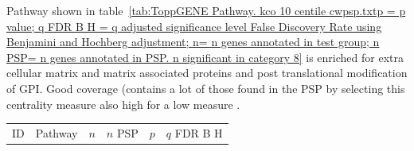 Pathway shown in table~\ref{tab:ToppGENE Pathway. kco 10 centile cwpsp.txtp = p value; q FDR B H = q adjusted significance level False Discovery Rate using Benjamini and Hochberg adjustment; n= n genes annotated in test group; n PSP= n genes annotated in PSP. n significant in category 8} is enriched for extra cellular matrix and matrix associated proteins and post translational modification of GPI. Good coverage (contains a lot of those found in the PSP by selecting this centrality measure also high for a low measure . 
 \begin{table}[ht]
\centering
\begin{adjustbox}{width=\textwidth}
\setlength{\extrarowheight}{2pt}
\begin{tabular}{@{}clllcl@{}}
  \toprule
  ID & Pathway & $n$ & $n$ PSP & $p$ & $q$ FDR B H \\ 


\end{tabular}
\end{adjustbox}
\end{table}
